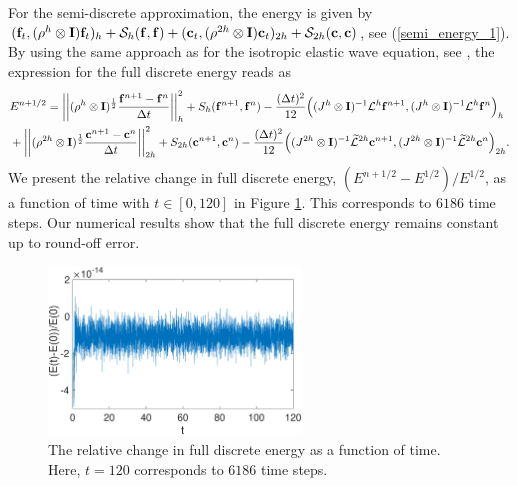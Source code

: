 For the semi-discrete approximation, the energy is given by $({\bf f}_t,({\rho}^h\otimes{\bf I}){\bf f}_t)_h + \mathcal{S}_h({\bf f},{\bf f}) + ({\bf c}_t,({\rho}^{2h}\otimes{\bf I}){\bf c}_t)_{2h} + \mathcal{S}_{2h}({\bf c},{\bf c})$, see (\ref{semi_energy_1}). By using the same approach as for the isotropic elastic wave equation, see \cite{petersson2015wave,sjogreen2012fourth},  the expression for the full discrete energy reads as
\begin{align*}
&E^{n+1/2} = \left|\left|(\rho^h\otimes {\bf I})^{\frac{1}{2}}\frac{{\bf f}^{n+1}-{\bf f}^n}{\Delta t}\right|\right|_h^2 + S_h({\bf f}^{n+1},{\bf f}^n) - \frac{(\Delta t)^2}{12}\Big((J^h\otimes{\bf I})^{-1}\mathcal{L}^h{\bf f}^{n+1},(J^h\otimes{\bf I})^{-1}\mathcal{L}^h{\bf f}^n\Big)_h\\
&+ \left|\left|(\rho^{2h}\otimes{\bf I})^{\frac{1}{2}}\frac{{\bf c}^{n+1}-{\bf c}^n}{\Delta t}\right|\right|_{2h}^2 + S_{2h}({\bf c}^{n+1},{\bf c}^n) - \frac{(\Delta t)^2}{12}\Big((J^{2h}\otimes{\bf I})^{-1}\widetilde{\mathcal{L}}^{2h}{\bf c}^{n+1},(J^{2h}\otimes{\bf I})^{-1}\widetilde{\mathcal{L}}^{2h}{\bf c}^n\Big)_{2h}.
\end{align*}
We present the relative change in full discrete energy, $(E^{n+1/2}-E^{1/2})/E^{1/2}$, as a function of time with $t\in[0,120]$ in Figure \ref{discrete_energy}. This corresponds to $6186$ time steps. Our numerical results show that the full discrete energy remains constant up to round-off error.
\begin{figure}[htbp]
	\centering
	\includegraphics[width=0.6\textwidth,trim={0cm 0cm 0cm 0cm}, clip]{discrete_energy.eps}
	\caption{The relative change in full discrete energy as a function of time. Here, $t = 120$ corresponds to $6186$ time steps.}\label{discrete_energy}
\end{figure}



